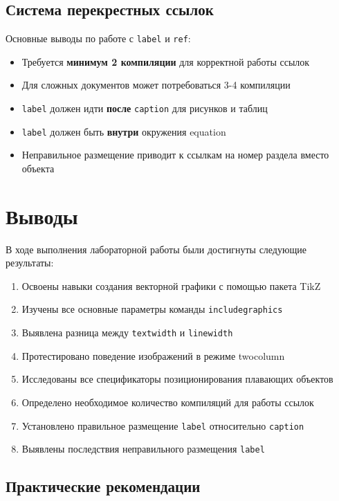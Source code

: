 \documentclass[12pt,a4paper]{article}
\begin{document}
\subsection{Система перекрестных ссылок}

Основные выводы по работе с \texttt{label} и \texttt{ref}:

\begin{itemize}
    \item Требуется \textbf{минимум 2 компиляции} для корректной работы ссылок
    \item Для сложных документов может потребоваться 3-4 компиляции
    \item \texttt{label} должен идти \textbf{после} \texttt{caption} для рисунков и таблиц
    \item \texttt{label} должен быть \textbf{внутри} окружения equation
    \item Неправильное размещение приводит к ссылкам на номер раздела вместо объекта
\end{itemize}

\section{Выводы}

В ходе выполнения лабораторной работы были достигнуты следующие результаты:

\begin{enumerate}
    \item Освоены навыки создания векторной графики с помощью пакета TikZ
    \item Изучены все основные параметры команды \texttt{includegraphics}
    \item Выявлена разница между \texttt{textwidth} и \texttt{linewidth}
    \item Протестировано поведение изображений в режиме twocolumn
    \item Исследованы все спецификаторы позиционирования плавающих объектов
    \item Определено необходимое количество компиляций для работы ссылок
    \item Установлено правильное размещение \texttt{label} относительно \texttt{caption}
    \item Выявлены последствия неправильного размещения \texttt{label}
\end{enumerate}

\subsection{Практические рекомендации}
\end{document}
